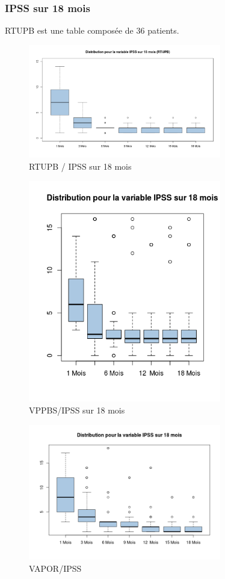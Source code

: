 %
%

\subsubsection{IPSS sur 18 mois }

RTUPB est une table composée de 36 patients. 
	
\begin{figure}[H]
\centering
\includegraphics[width=0.75\textwidth]{../Fig/RTUPB/rtupb-boxplot-post-ipss}
\caption{RTUPB / IPSS sur 18 mois}
\end{figure}	
	
\begin{figure}[H]
\centering
\includegraphics[width=0.75\textwidth]{../Fig/VPPBS/vppbs-boxplot-post-ipss}
\caption{VPPBS/IPSS sur 18 mois}
\end{figure}


\begin{figure}[H]
\centering
\includegraphics[width=0.75\textwidth]{../Fig/VAPOR/vapor-boxplot-post-ipss}
\caption{VAPOR/IPSS}
\end{figure}

%
